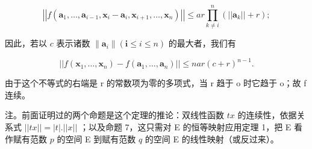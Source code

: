 \[
\left| \left| f \left(\boldsymbol {a} _ {1}, \dots , \boldsymbol {a} _ {i - 1}, \boldsymbol {x} _ {i} - \boldsymbol {a} _ {i}, \boldsymbol {x} _ {i + 1}, \dots , \boldsymbol {x} _ {n}\right) \right| \right| \leqslant a r \prod_ {k \neq i} ^ {n} \left(\left| \left| \boldsymbol {a} _ {k} \right| \right| + r\right);
\]

因此，若以 \(c\) 表示诸数 \(\| \pmb{a}_i \| (\mathbf{i} \leqslant i \leqslant n)\) 的最大者，我们有

\[
\left| \left| f \left(\boldsymbol {x} _ {1}, \dots , \boldsymbol {x} _ {n}\right) - f \left(\boldsymbol {a} _ {1}, \dots , \boldsymbol {a} _ {n}\right) \right| \right| \leqslant n a r (c + r) ^ {n - 1}.
\]

由于这个不等式的右端是 r 的常数项为零的多项式，当 r 趋于 o 时它趋于 o；故 f 连续。

注。前面证明过的两个命题是这个定理的推论：双线性函数 \(tx\) 的连续性，依据关系式 \(||tx|| = |t|.||x||\) ；以及命题 7，这只需对 E 的恒等映射应用定理 1，把 E 看作赋有范数 \(p\) 的空间 E 到赋有范数 \(q\) 的空间 E 的线性映射（或反过来）。

